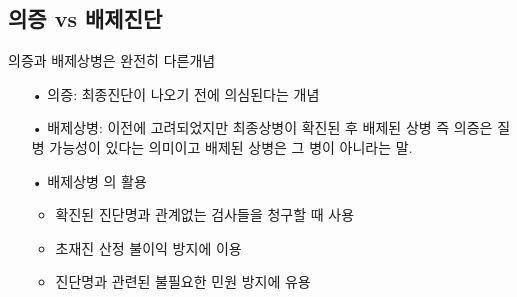 \subsection{의증 vs 배제진단}
의증과 배제상병은 완전히 다른개념
\begin{itemize}\tightlist
\item[•] 의증: 최종진단이 나오기 전에 의심된다는 개념
\item[•] 배제상병: 이전에 고려되었지만 최종상병이 확진된 후 배제된 상병 즉 의증은 질병 가능성이 있다는 의미이고 배제된 상병은 그 병이 아니라는 말.
\item[•] 배제상병 의 활용  
	\begin{itemize}[▲]\tightlist
	\item 확진된 진단명과 관계없는 검사들을 청구할 때 사용 
	\item 초재진 산정 불이익 방지에 이용 
	\item 진단명과 관련된 불필요한 민원 방지에 유용
	\end{itemize}
\end{itemize}	
